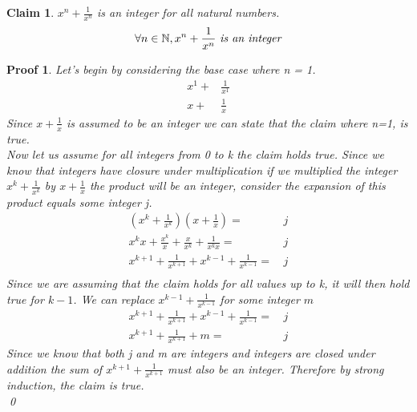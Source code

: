 \documentclass[11pt]{article}
\newtheorem*{claim}{Claim}
\newtheorem*{poof}{Proof}
\begin{document}
\begin{claim}
     $x^n+\frac{1}{x^n}$ is an integer for all natural numbers.
     $$\forall n \in \mathbb{N}, x^n +\frac{1}{x^n}\text{ \emph{is an integer}}$$
\end{claim}
\begin{poof}
     Let's begin by considering the base case where n = 1.
    \begin{align*}
         x^1+&\frac{1}{x^1}\\         x+&\frac{1}{x}
    \end{align*}
    Since $x+\frac{1}{x}$ is assumed to be an integer we can state that the claim where n=1, is true.
    \\
    
    \noindent Now let us assume for all integers from 0 to k the claim holds true. Since we know that integers have closure under multiplication if we multiplied the integer $x^k+\frac{1}{x^k}$ by $x+\frac{1}{x}$ the product will be an integer, consider the expansion of this product equals some integer j.
    \begin{align*}
        (x^k+\frac{1}{x^k})(x+\frac{1}{x})=&\,j\\
        x^kx+\frac{x^k}{x}+\frac{x}{x^k}+\frac{1}{x^kx}=&\,j\\
        x^{k+1}+\frac{1}{x^{k+1}}+x^{k-1}+\frac{1}{x^{k-1}}=&\,j\\
    \end{align*}
    Since we are assuming that the claim holds for all values up to k, it will then hold true for $k-1$. We can replace $x^{k-1}+\frac{1}{x^{k-1}}$ for some integer $m$
    \begin{align*}
        x^{k+1}+\frac{1}{x^{k+1}}+x^{k-1}+\frac{1}{x^{k-1}}=&\,j\\
        x^{k+1}+\frac{1}{x^{k+1}}+m=&\,j
    \end{align*}
    Since we know that both j and m are integers and integers are closed under addition the sum of $x^{k+1}+\frac{1}{x^{k+1}}$ must also be an integer. Therefore by strong induction, the claim is true.
    \\
    \qed
\end{poof}

\newpage
\end{document}
